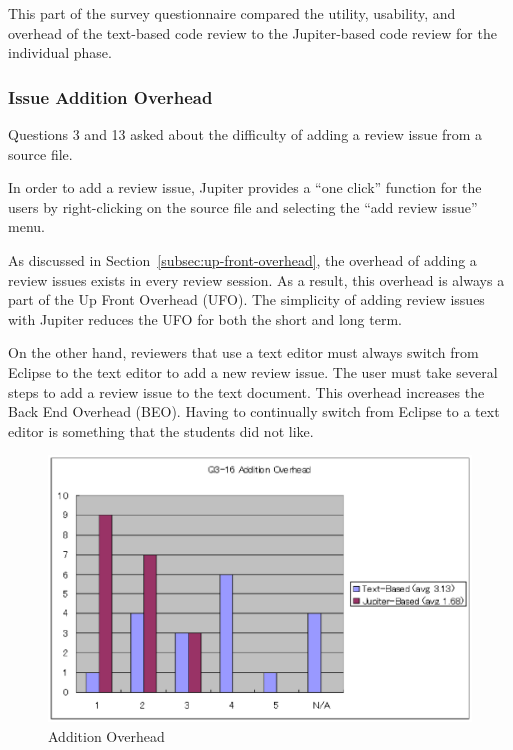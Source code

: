 This part of the survey questionnaire compared the utility, usability, and overhead of the text-based code review to the Jupiter-based code review for the individual phase.

\subsubsection{Issue Addition Overhead}
\label{subsubsec:issue-addition-overhead}

Questions 3 and 13 asked about the difficulty of adding a review issue from a source file.

In order to add a review issue, Jupiter provides a ``one click'' function for the users by right-clicking on the source file and selecting the ``add review issue'' menu.

As discussed in Section~\ref{subsec:up-front-overhead}, the overhead of adding a review issues exists in every review session. As a result, this overhead is always a part of the Up Front Overhead (UFO). The simplicity of adding review issues with Jupiter reduces the UFO for both the short and long term.

On the other hand, reviewers that use a text editor must always switch from Eclipse to the text editor to add a new review issue. The user must take several steps to add a review issue to the text document. This overhead increases the Back End Overhead (BEO). Having to continually switch from Eclipse to a text editor is something that the students did not like.

\begin{figure}[htbp]
  \centering
  \includegraphics{images/fig5-4.eps}
  \caption{Addition Overhead}
  \label{fig5-4}
\end{figure}

